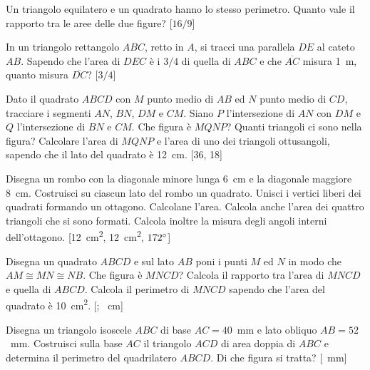\begin{multicols}{2}
\begin{esercizio}
\label{ese:7.41}
Un triangolo equilatero e un quadrato hanno lo stesso perimetro. Quanto vale il rapporto tra le aree delle due figure?
[$16/9$]
\end{esercizio}

\begin{esercizio}
\label{ese:7.42}
In un triangolo rettangolo $ABC$, retto in $A$, si tracci una parallela $DE$ al cateto $AB$. Sapendo che l'area di $DEC$ è i $3/4$ di quella di $ABC$ e che $\overline{AC}$ misura 1~m, quanto misura $\overline{DC}$? [$3/4$]
\end{esercizio}

\begin{esercizio}
\label{ese:7.43}
Dato il quadrato $ABCD$ con $M$ punto medio di $AB$ ed $N$ punto medio di $CD$, tracciare i segmenti $AN$, $BN$, $DM$ e $CM$. Siano $P$ l'intersezione di $AN$ con $DM$ e $Q$ l'intersezione di $BN$ e $CM$. Che figura è $MQNP$? Quanti triangoli ci sono nella figura? Calcolare l'area di $MQNP$ e l'area di uno dei triangoli ottusangoli, sapendo che il lato del quadrato è 12~cm.
[36, 18]
\end{esercizio}

\begin{esercizio}
\label{ese:7.44}
Disegna un rombo con la diagonale minore lunga 6~cm e la diagonale maggiore 8~cm. Costruisci su ciascun lato del rombo un quadrato. Unisci i vertici liberi dei quadrati formando un ottagono. Calcolane l'area. Calcola anche l'area dei quattro triangoli che si sono formati. Calcola inoltre la misura degli angoli interni dell'ottagono.
[12~cm\textsuperscript{2}, 12~cm\textsuperscript{2}, $172{}^{\circ}$]
\end{esercizio}

\begin{esercizio}
\label{ese:7.45}
Disegna un quadrato $ABCD$ e sul lato $AB$ poni i punti $M$ ed $N$ in modo che $AM\cong MN\cong NB$. Che figura è $MNCD$? Calcola il rapporto tra l'area di $MNCD$ e quella di $ABCD$. Calcola il perimetro di $MNCD$ sapendo che l'area del quadrato è 10~cm\textsuperscript{2}.
[; ~cm]
\end{esercizio}

\begin{esercizio}
\label{ese:7.46}
Disegna un triangolo isoscele $ABC$ di base $AC=40$~mm e lato obliquo $AB=52$~mm. Costruisci sulla base $AC$ il triangolo $ACD$ di area doppia di $ABC$ e determina il perimetro del quadrilatero $ABCD$. Di che figura si tratta?
[~mm]
\end{esercizio}


\end{multicols}
